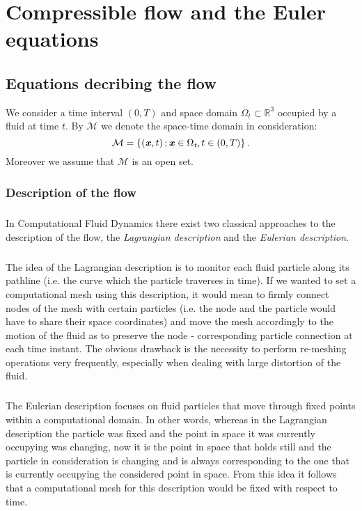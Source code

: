 \chapter{Compressible flow and the Euler equations}
	\section{Equations decribing the flow}
	We consider a time interval $\left(0,T\right)$ and space domain $\Omega_{\textit{t}}\subset \mathbb{R}^3$ occupied by a fluid at time $t$.
	By $\mathcal{M}$ we denote the space-time domain in consideration: 
\begin{equation}\label{M}
 \mathcal{M}=\left\{\left(\textbf{\textit{x}},t\right);\\\textbf{\textit{x}}\in\Omega_{\textit{t}},t\in\left(0,T\right)\right \}.
\end{equation}
	Moreover we assume that $\mathcal{M}$ is an open set.
\subsection{Description of the flow}
\paragraph{}
In Computational Fluid Dynamics there exist two classical approaches to the description of the flow, the \textit{Lagrangian description} and the \textit{Eulerian description}.
\paragraph{}

The idea of the Lagrangian description is to monitor each fluid particle along its pathline (i.e. the curve which the particle traverses in time).
If we wanted to set a computational mesh using this description, it would mean to firmly connect nodes of the mesh with certain particles (i.e. the node and the particle would have to share their space coordinates) and move the mesh accordingly to the motion of the fluid as to preserve the node - corresponding particle connection at each time instant.
The obvious drawback is the necessity to perform re-meshing operations very frequently, especially when dealing with large distortion of the fluid.
\paragraph{}

The Eulerian description focuses on fluid particles that move through fixed points within a computational domain. In other words, whereas in the Lagrangian description the particle was fixed and the point in space it was currently occupying was changing, now it is the point in space that holds still and the particle in consideration is changing and is always corresponding to the one that is currently occupying the considered point in space. From this idea it follows that a computational mesh for this description would be fixed with respect to time.
